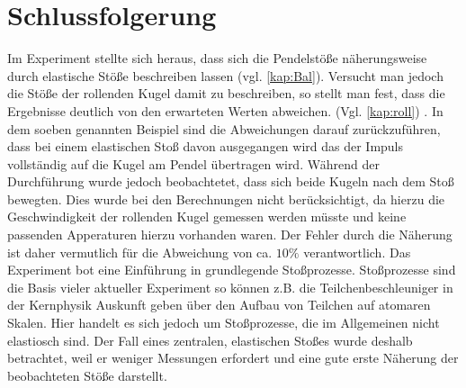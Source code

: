 
\section{Schlussfolgerung}
Im Experiment stellte sich heraus, dass sich die Pendelstöße näherungsweise durch elastische Stöße beschreiben lassen (vgl. \cref{kap:Bal}). Versucht man jedoch die Stöße der rollenden Kugel damit zu beschreiben, so stellt man fest, dass die Ergebnisse deutlich von den erwarteten Werten abweichen. (Vgl. \cref{kap:roll}) .
In dem soeben genannten Beispiel sind die Abweichungen darauf zurückzuführen, dass bei einem elastischen Stoß davon ausgegangen wird das der Impuls vollständig auf die Kugel am Pendel übertragen wird. Während der Durchführung wurde jedoch beobachtetet, dass sich beide Kugeln nach dem Stoß bewegten. Dies wurde bei den Berechnungen nicht berücksichtigt, da hierzu die Geschwindigkeit der rollenden Kugel gemessen werden müsste und keine passenden Apperaturen hierzu vorhanden waren. Der Fehler durch die Näherung ist daher vermutlich für die Abweichung von ca. $10\%$ verantwortlich.
Das Experiment bot eine Einführung in grundlegende Stoßprozesse.
Stoßprozesse sind die Basis vieler aktueller Experiment so können z.B. die Teilchenbeschleuniger in der Kernphysik Auskunft geben über den Aufbau von Teilchen auf atomaren Skalen. Hier handelt es sich jedoch um Stoßprozesse, die im Allgemeinen nicht elastiosch sind.
Der Fall eines zentralen, elastischen Stoßes wurde deshalb betrachtet, weil er weniger Messungen erfordert und eine gute erste Näherung der beobachteten Stöße darstellt. 





